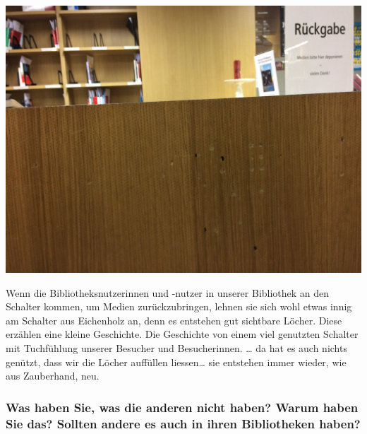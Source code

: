 \begin{center}
\includegraphics{fhs-st-gallen/img/spuren-bibliotheksnutzung.jpg}
\end{center}

Wenn die Bibliotheksnutzerinnen und -nutzer in unserer Bibliothek an den
Schalter kommen, um Medien zurückzubringen, lehnen sie sich wohl etwas
innig am Schalter aus Eichenholz an, denn es entstehen gut sichtbare
Löcher. Diese erzählen eine kleine Geschichte. Die Geschichte von einem
viel genutzten Schalter mit Tuchfühlung unserer Besucher und
Besucherinnen. \ldots{} da hat es auch nichts genützt, dass wir die
Löcher auffüllen liessen\ldots{} sie entstehen immer wieder, wie aus
Zauberhand, neu.

\hypertarget{was-haben-sie-was-die-anderen-nicht-haben-warum-haben-sie-das-sollten-andere-es-auch-in-ihren-bibliotheken-haben}{%
\subsubsection*{Was haben Sie, was die anderen nicht haben? Warum haben Sie
das? Sollten andere es auch in ihren Bibliotheken
haben?}\label{was-haben-sie-was-die-anderen-nicht-haben-warum-haben-sie-das-sollten-andere-es-auch-in-ihren-bibliotheken-haben}}


